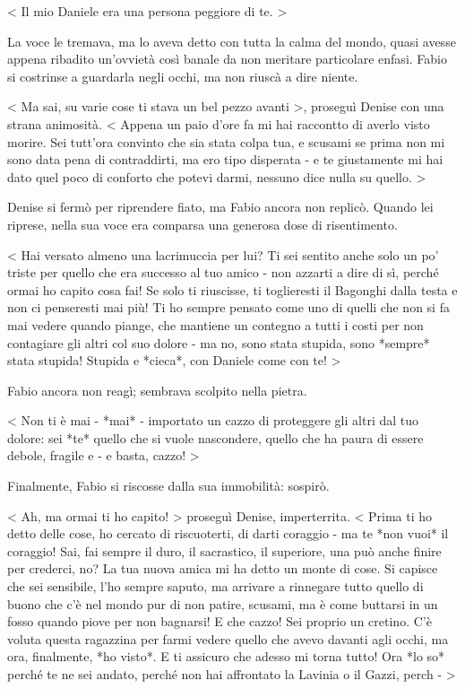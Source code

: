 < Il mio Daniele era una persona peggiore di te. >

La voce le tremava, ma lo aveva detto con tutta la calma del mondo, quasi avesse appena ribadito un'ovvietà così banale da non meritare particolare enfasi. Fabio si costrinse a guardarla negli occhi, ma non riuscà a dire niente.

< Ma sai, su varie cose ti stava un bel pezzo avanti >, proseguì Denise con una strana animosità. < Appena un paio d'ore fa mi hai raccontto di averlo visto morire. Sei tutt'ora convinto che sia stata colpa tua, e scusami se prima non mi sono data pena di contraddirti, ma ero tipo disperata - e te giustamente mi hai dato quel poco di conforto che potevi darmi, nessuno dice nulla su quello.  >

Denise si fermò per riprendere fiato, ma Fabio ancora non replicò. Quando lei riprese, nella sua voce era comparsa una generosa dose di risentimento.

< Hai versato almeno una lacrimuccia per lui? Ti sei sentito anche solo un po' triste per quello che era successo al tuo amico - non azzarti a dire di sì, perché ormai ho capito cosa fai! Se solo ti riuscisse, ti toglieresti il Bagonghi dalla testa e non ci penseresti mai più! Ti ho sempre pensato come uno di quelli che non si fa mai vedere quando piange, che mantiene un contegno a tutti i costi per non contagiare gli altri col suo dolore - ma no, sono stata stupida, sono *sempre* stata stupida! Stupida e *cieca*, con Daniele come con te! >

Fabio ancora non reagì; sembrava scolpito nella pietra.

< Non ti è mai - *mai* - importato un cazzo di proteggere gli altri dal tuo dolore: sei *te* quello che si vuole nascondere, quello che ha paura di essere debole, fragile e - e basta, cazzo! >

Finalmente, Fabio si riscosse dalla sua immobilità: sospirò.

< Ah, ma ormai ti ho capito! > proseguì Denise, imperterrita. < Prima ti ho detto delle cose, ho cercato di riscuoterti, di darti coraggio - ma te *non vuoi* il coraggio! Sai, fai sempre il duro, il sacrastico, il superiore, una può anche finire per crederci, no? La tua nuova amica mi ha detto un monte di cose. Si capisce che sei sensibile, l'ho sempre saputo, ma arrivare a rinnegare tutto quello di buono che c'è nel mondo pur di non patire, scusami, ma è come buttarsi in un fosso quando piove per non bagnarsi! E che cazzo! Sei proprio un cretino. C'è voluta questa ragazzina per farmi vedere quello che avevo davanti agli occhi, ma ora, finalmente, *ho visto*. E ti assicuro che adesso mi torna tutto! Ora *lo so* perché te ne sei andato, perché non hai affrontato la Lavinia o il Gazzi, perch - >


